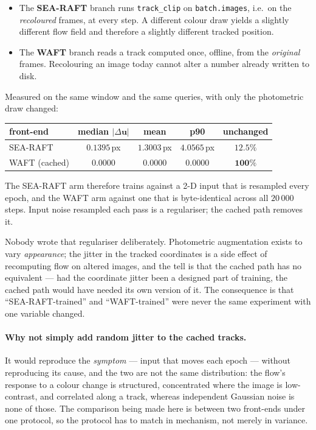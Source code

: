\documentclass[11pt,a4paper]{article}
\begin{document}
\begin{itemize}
  \item The \textbf{SEA-RAFT} branch runs \texttt{track\_clip} on \texttt{batch.images}, i.e.\ on
    the \emph{recoloured} frames, at every step. A different colour draw yields a slightly different
    flow field and therefore a slightly different tracked position.
  \item The \textbf{WAFT} branch reads a track computed once, offline, from the \emph{original}
    frames. Recolouring an image today cannot alter a number already written to disk.
\end{itemize}

\noindent Measured on the same window and the same queries, with only the photometric draw changed:

\begin{center}
\begin{tabular}{lcccc}
\toprule
front-end & median $|\Delta \mathbf{u}|$ & mean & p90 & unchanged \\
\midrule
SEA-RAFT & $0.1395$\,px & $1.3003$\,px & $4.0565$\,px & $12.5\%$ \\
WAFT (cached) & $0.0000$ & $0.0000$ & $0.0000$ & $\mathbf{100\%}$ \\
\bottomrule
\end{tabular}
\end{center}

\noindent The SEA-RAFT arm therefore trains against a 2-D input that is resampled every epoch, and
the WAFT arm against one that is byte-identical across all $20\,000$ steps. Input noise resampled
each pass is a regulariser; the cached path removes it.

Nobody wrote that regulariser deliberately. Photometric augmentation exists to vary
\emph{appearance}; the jitter in the tracked coordinates is a side effect of recomputing flow on
altered images, and the tell is that the cached path has no equivalent --- had the coordinate jitter
been a designed part of training, the cached path would have needed its own version of it. The
consequence is that ``SEA-RAFT-trained'' and ``WAFT-trained'' were never the same experiment with one
variable changed.

\paragraph{Why not simply add random jitter to the cached tracks.} It would reproduce the
\emph{symptom} --- input that moves each epoch --- without reproducing its cause, and the two are not
the same distribution: the flow's response to a colour change is structured, concentrated where the
image is low-contrast, and correlated along a track, whereas independent Gaussian noise is none of
those. The comparison being made here is between two front-ends under one protocol, so the protocol
has to match in mechanism, not merely in variance.
\end{document}
